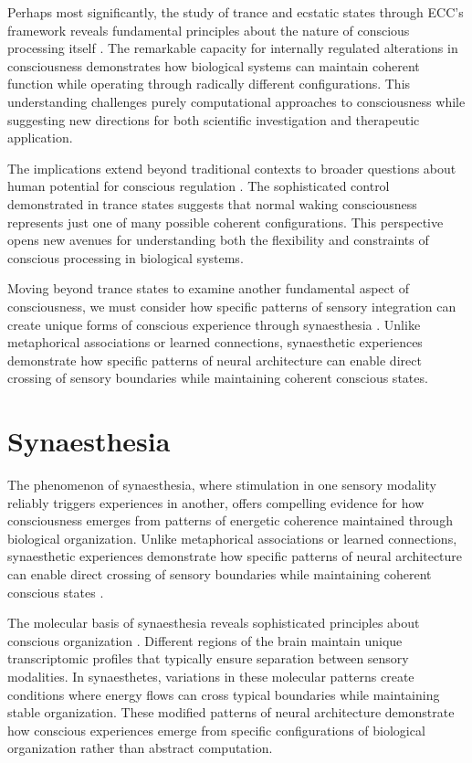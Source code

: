 \begin{refsection}
Perhaps most significantly, the study of trance and ecstatic states through ECC's framework reveals fundamental principles about the nature of conscious processing itself \cite{Rouget1985}. The remarkable capacity for internally regulated alterations in consciousness demonstrates how biological systems can maintain coherent function while operating through radically different configurations. This understanding challenges purely computational approaches to consciousness while suggesting new directions for both scientific investigation and therapeutic application.

The implications extend beyond traditional contexts to broader questions about human potential for conscious regulation \cite{Lewis2003}. The sophisticated control demonstrated in trance states suggests that normal waking consciousness represents just one of many possible coherent configurations. This perspective opens new avenues for understanding both the flexibility and constraints of conscious processing in biological systems.

Moving beyond trance states to examine another fundamental aspect of consciousness, we must consider how specific patterns of sensory integration can create unique forms of conscious experience through synaesthesia \cite{Goodman1988}. Unlike metaphorical associations or learned connections, synaesthetic experiences demonstrate how specific patterns of neural architecture can enable direct crossing of sensory boundaries while maintaining coherent conscious states.

\section{Synaesthesia}

The phenomenon of synaesthesia, where stimulation in one sensory modality reliably triggers experiences in another, offers compelling evidence for how consciousness emerges from patterns of energetic coherence maintained through biological organization. Unlike metaphorical associations or learned connections, synaesthetic experiences demonstrate how specific patterns of neural architecture can enable direct crossing of sensory boundaries while maintaining coherent conscious states \cite{Ramachandran2001}.

The molecular basis of synaesthesia reveals sophisticated principles about conscious organization \cite{Hubbard2005}. Different regions of the brain maintain unique transcriptomic profiles that typically ensure separation between sensory modalities. In synaesthetes, variations in these molecular patterns create conditions where energy flows can cross typical boundaries while maintaining stable organization. These modified patterns of neural architecture demonstrate how conscious experiences emerge from specific configurations of biological organization rather than abstract computation.


\end{refsection}
